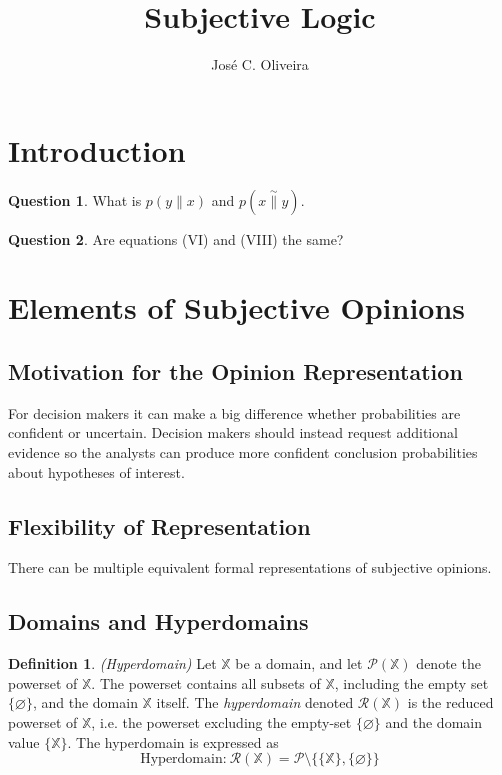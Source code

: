 \documentclass[a4paper,12pt]{article}
\title{Subjective Logic}
\author{José C. Oliveira}
\theoremstyle{definition}
\newtheorem{question}{Question}[section]
\newtheorem{definition}{Definition}[section]
\numberwithin{equation}{section}
\begin{document}
\maketitle

%

\section{Introduction}

\begin{question}
	What is $p(y \parallel x)$ and $p(x \overset{\sim}{\parallel} y)$.
\end{question}

\begin{question}
	Are equations (VI) and (VIII) the same?
\end{question}


\section{Elements of Subjective Opinions}

\subsection{Motivation for the Opinion Representation}

For decision makers it can make a big difference whether probabilities are confident or uncertain. Decision makers should instead request additional evidence so the analysts can produce more confident conclusion probabilities
about hypotheses of interest.

\subsection{Flexibility of Representation}

There can be multiple equivalent formal representations of subjective opinions.

\subsection{Domains and Hyperdomains}

\begin{definition}
	 \emph{(Hyperdomain)} Let $\mathbb{X}$ be a domain, and let $\mathcal{P}(\mathbb{X})$ denote the powerset of $\mathbb{X}$. The powerset contains all subsets of $\mathbb{X}$, including the empty set $\{\varnothing\}$, and the domain $\mathbb{X}$ itself. The \emph{hyperdomain} denoted $\mathcal{R}(\mathbb{X})$ is the reduced powerset of $\mathbb{X}$, i.e. the powerset excluding the empty-set $\{\varnothing\}$ and the domain value $\{\mathbb{X}\}$. The hyperdomain is expressed as
	\begin{equation}
		\text{Hyperdomain:}\ \mathcal{R}(\mathbb{X}) = \mathcal{P} \setminus \{\{\mathbb{X}\}, \{\varnothing\}\}
	\end{equation}
\end{definition}
\end{document}
